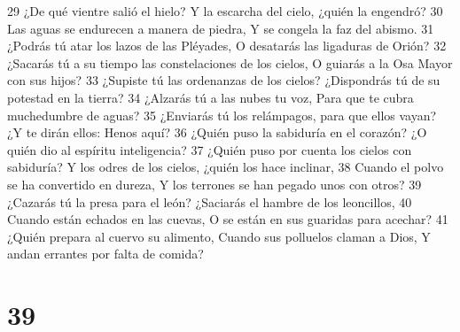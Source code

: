 29 ¿De qué vientre salió el hielo?  
Y la escarcha del cielo, ¿quién la engendró?  
30 Las aguas se endurecen a manera de piedra,  
Y se congela la faz del abismo.  
31 ¿Podrás tú atar los lazos de las Pléyades,  
O desatarás las ligaduras de Orión? 
32 ¿Sacarás tú a su tiempo las constelaciones de los cielos,  
O guiarás a la Osa Mayor con sus hijos?  
33 ¿Supiste tú las ordenanzas de los cielos?  
¿Dispondrás tú de su potestad en la tierra?  
34 ¿Alzarás tú a las nubes tu voz,  
Para que te cubra muchedumbre de aguas?  
35 ¿Enviarás tú los relámpagos, para que ellos vayan?  
¿Y te dirán ellos: Henos aquí?  
36 ¿Quién puso la sabiduría en el corazón?  
¿O quién dio al espíritu inteligencia?  
37 ¿Quién puso por cuenta los cielos con sabiduría?  
Y los odres de los cielos, ¿quién los hace inclinar,  
38 Cuando el polvo se ha convertido en dureza,  
Y los terrones se han pegado unos con otros?  
39 ¿Cazarás tú la presa para el león?  
¿Saciarás el hambre de los leoncillos,  
40 Cuando están echados en las cuevas,  
O se están en sus guaridas para acechar?  
41 ¿Quién prepara al cuervo su alimento,  
Cuando sus polluelos claman a Dios,  
Y andan errantes por falta de comida?  

\chapter{39}


